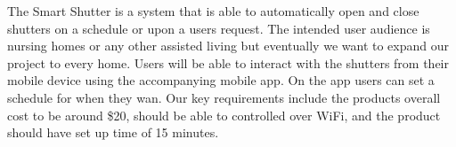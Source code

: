 The Smart Shutter is a system that is able to automatically open and close shutters on a schedule or upon a users request. The intended user audience is nursing homes or any other assisted living but eventually we want to expand our project to every home. Users will be able to interact with the shutters from their mobile device using the accompanying mobile app. On the app users can set a schedule for when they wan. Our key requirements include the products overall cost to be around \$20, should be able to controlled over WiFi, and the product should have set up time of 15 minutes.